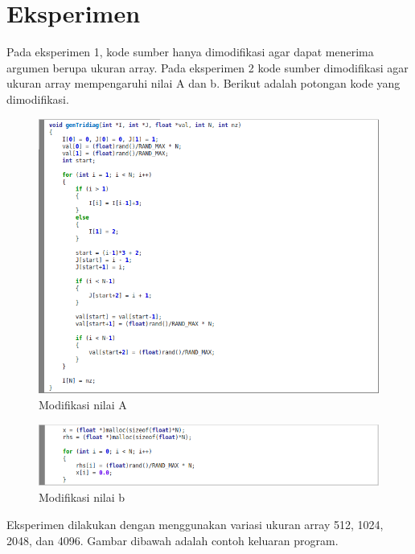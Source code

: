 \section{Eksperimen}

Pada eksperimen 1, kode sumber hanya dimodifikasi agar dapat menerima argumen berupa ukuran array.  Pada eksperimen 2 kode sumber dimodifikasi agar ukuran array mempengaruhi nilai A dan b.  Berikut adalah potongan kode yang dimodifikasi.

\begin{figure}
	\centering
	\includegraphics[width=1\textwidth]
	{pics/code1}
	\caption{Modifikasi nilai A}
	\label{fig:code1}
\end{figure}

\begin{figure}
	\centering
	\includegraphics[width=1\textwidth]
	{pics/code2}
	\caption{Modifikasi nilai b}
	\label{fig:code2}
\end{figure}

Eksperimen dilakukan dengan menggunakan variasi ukuran array 512, 1024, 2048, dan 4096.  Gambar dibawah adalah contoh keluaran program.

